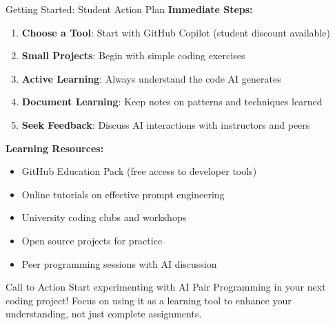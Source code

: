 \documentclass{beamer}
\begin{document}
\begin{frame}[t]{Getting Started: Student Action Plan}
    \textbf{Immediate Steps:}
    \begin{enumerate}
        \item \textbf{Choose a Tool}: Start with GitHub Copilot (student discount available)
        \item \textbf{Small Projects}: Begin with simple coding exercises
        \item \textbf{Active Learning}: Always understand the code AI generates
        \item \textbf{Document Learning}: Keep notes on patterns and techniques learned
        \item \textbf{Seek Feedback}: Discuss AI interactions with instructors and peers
    \end{enumerate}
    
    \textbf{Learning Resources:}
    \begin{itemize}
        \item GitHub Education Pack (free access to developer tools)
        \item Online tutorials on effective prompt engineering
        \item University coding clubs and workshops
        \item Open source projects for practice
        \item Peer programming sessions with AI discussion
    \end{itemize}
    
    \begin{exampleblock}{Call to Action}
        Start experimenting with AI Pair Programming in your next coding project! Focus on using it as a learning tool to enhance your understanding, not just complete assignments.
    \end{exampleblock}
\end{frame}
\end{document}
